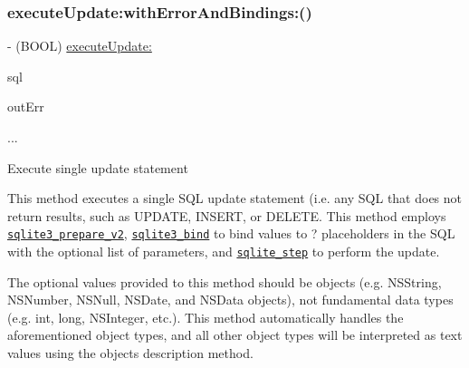 \subsubsection{\texorpdfstring{execute\+Update\+:with\+Error\+And\+Bindings\+:()}{executeUpdate:withErrorAndBindings:()}}
{\footnotesize\ttfamily -\/ (B\+O\+OL) \mbox{\hyperlink{interface_o_p_t_l_y_f_m_d_b_database_aacce81f6c3456a804e1d558462bca313}{execute\+Update\+:}} \begin{DoxyParamCaption}\item[{(N\+S\+String $\ast$)}]{sql }\item[{withErrorAndBindings:(N\+S\+Error $\ast$\+\_\+\+Nullable $\ast$)}]{out\+Err }\item[{,}]{... }\end{DoxyParamCaption}}

Execute single update statement

This method executes a single S\+QL update statement (i.\+e. any S\+QL that does not return results, such as {\ttfamily U\+P\+D\+A\+TE}, {\ttfamily I\+N\+S\+E\+RT}, or {\ttfamily D\+E\+L\+E\+TE}. This method employs \href{http://sqlite.org/c3ref/prepare.html}{\tt {\ttfamily sqlite3\+\_\+prepare\+\_\+v2}}, \href{http://sqlite.org/c3ref/bind_blob.html}{\tt {\ttfamily sqlite3\+\_\+bind}} to bind values to {\ttfamily ?} placeholders in the S\+QL with the optional list of parameters, and \href{http://sqlite.org/c3ref/step.html}{\tt {\ttfamily sqlite\+\_\+step}} to perform the update.

The optional values provided to this method should be objects (e.\+g. {\ttfamily N\+S\+String}, {\ttfamily N\+S\+Number}, {\ttfamily N\+S\+Null}, {\ttfamily N\+S\+Date}, and {\ttfamily N\+S\+Data} objects), not fundamental data types (e.\+g. {\ttfamily int}, {\ttfamily long}, {\ttfamily N\+S\+Integer}, etc.). This method automatically handles the aforementioned object types, and all other object types will be interpreted as text values using the object\textquotesingle{}s {\ttfamily description} method.


